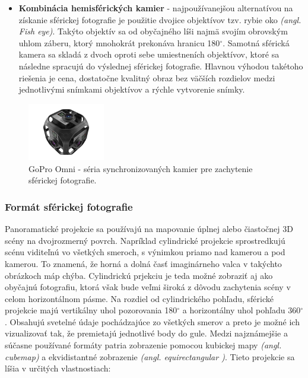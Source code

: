 \documentclass[slovak,master,dept460,male,cpp,cpdeclaration]{diploma}
\begin{document}
\begin{itemize}
\item \textbf{Kombinácia hemisférických kamier} - najpoužívanejšou alternatívou na získanie sférickej fotografie je použitie dvojice objektívov tzv. rybie oko \textit{(angl. Fish eye)}. Takýto objektív sa od obyčajného líši najmä svojím obrovským uhlom záberu, ktorý  mnohokrát prekonáva hranicu 180$ ^\circ$. Samotná sférická kamera sa skladá z dvoch oproti sebe umiestneních objektívov, ktoré sa následne spracujú do výslednej sférickej fotografie. Hlavnou výhodou takétoho riešenia je cena, dostatočne kvalitný obraz bez väčších rozdielov medzi jednotlivými snímkami objektívov a rýchle vytvorenie snímky.

\end{itemize}

\begin{figure}[H]
	\centering
	\includegraphics[width=0.3\textwidth]{Figures/goproOmni.jpg}
	\caption{GoPro Omni - séria synchronizovaných kamier pre zachytenie sférickej fotografie.\cite{goproOmni}}
	\label{fig:goproOmni}
\end{figure}


\subsubsection*{Formát sférickej fotografie}
Panoramatické projekcie sa používajú na mapovanie úplnej alebo čiastočnej 3D scény na dvojrozmerný povrch. Napríklad cylindrické projekcie sprostredkujú scénu viditeľnú vo všetkých smeroch, s výnimkou priamo nad kamerou a pod kamerou. To znamená, že horná a dolná časť imaginárneho valca v takýchto obrázkoch máp chýba. Cylindrickú prjekciu je teda možné zobraziť aj ako obyčajnú fotografiu, ktorá však bude veľmi  široká z dôvodu zachytenia scény v celom horizontálnom pásme.
Na rozdiel od cylindrického pohľadu, sférické projekcie majú vertikálny uhol pozorovania 180$ ^\circ$ a horizontálny uhol pohľadu 360$ ^\circ$. Obsahujú svetelné údaje pochádzajúce zo všetkých smerov a preto je možné ich vizualizovať tak, že premietajú jednotlivé body do gule. Medzi najznámejšie  a súčasne používané formáty patria zobrazenie pomocou kubickej mapy \textit{(angl. cubemap)} a ekvidistantné zobrazenie \textit{(angl. equirectangular )}. Tieto projekcie  sa líšia v určitých vlastnostiach:
\end{document}

